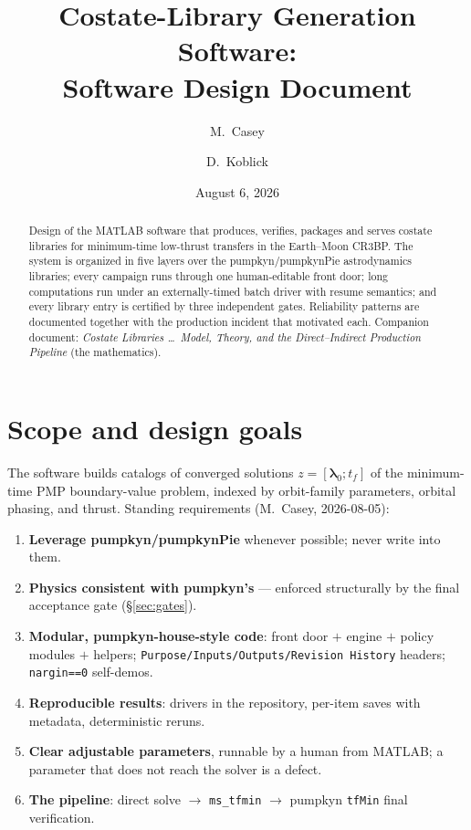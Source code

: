 \documentclass[11pt]{article}
\title{Costate-Library Generation Software:\\ \large Software Design Document}
\author{M.~Casey \and D.~Koblick}
\date{August 6, 2026}
\begin{document}
\maketitle

\begin{abstract}
Design of the MATLAB software that produces, verifies, packages and serves
costate libraries for minimum-time low-thrust transfers in the Earth--Moon
CR3BP. The system is organized in five layers over the pumpkyn/pumpkynPie
astrodynamics libraries; every campaign runs through one human-editable
front door; long computations run under an externally-timed batch driver
with resume semantics; and every library entry is certified by three
independent gates. Reliability patterns are documented together with the
production incident that motivated each. Companion document:
\emph{Costate Libraries \dots\ Model, Theory, and the Direct--Indirect
Production Pipeline} (the mathematics).
\end{abstract}

\tableofcontents

\section{Scope and design goals}

The software builds catalogs of converged solutions
$z=[\bm\lambda_0;t_f]$ of the minimum-time PMP boundary-value problem,
indexed by orbit-family parameters, orbital phasing, and thrust. Standing
requirements (M.~Casey, 2026-08-05):

\begin{enumerate}
\item \textbf{Leverage pumpkyn/pumpkynPie} whenever possible; never write
      into them.
\item \textbf{Physics consistent with pumpkyn's} --- enforced structurally
      by the final acceptance gate (\S\ref{sec:gates}).
\item \textbf{Modular, pumpkyn-house-style code}: front door $+$ engine $+$
      policy modules $+$ helpers; \texttt{Purpose/Inputs/Outputs/Revision
      History} headers; \texttt{nargin==0} self-demos.
\item \textbf{Reproducible results}: drivers in the repository, per-item
      saves with metadata, deterministic reruns.
\item \textbf{Clear adjustable parameters}, runnable by a human from
      MATLAB; a parameter that does not reach the solver is a defect.
\item \textbf{The pipeline}: direct solve $\to$ \texttt{ms\_tfmin} $\to$
      pumpkyn \texttt{tfMin} final verification.
\end{enumerate}
\end{document}

